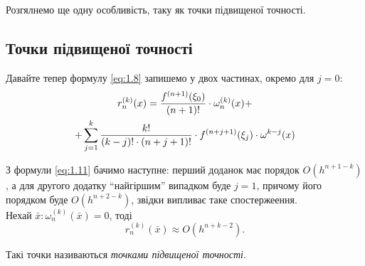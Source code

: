 Розгялнемо ще одну особливість, таку як точки підвищеної точності.

\subsection{Точки підвищеної точності}

Давайте тепер формулу \eqref{eq:1.8} запишемо у двох частинах, окремо для $j = 0$:
\begin{multline}
	\label{eq:1.11}
	r_n^{(k)}(x) = \frac{f^{(n + 1)}(\xi_0)}{(n + 1)!} \cdot \omega_n^{(k)}(x) + \\ + \displaystyle\sum\limits_{j = 1}^k \frac{k!}{(k-j)! \cdot (n+j+1)!} \cdot f^{(n + j + 1)}(\xi_j) \cdot \omega^{k - j}(x)
\end{multline}

З формули \eqref{eq:1.11} бачимо наступне: перший доданок має порядок $O(h^{n + 1 - k})$, а для другого додатку ``найгіршим'' випадком буде $j = 1$, причому його порядком буде $O(h^{n + 2 - k})$, звідки випливає таке спостержеення. \\

Нехай $\bar x: \omega_n^{(k)}(\bar x) = 0$, тоді 
\begin{equation}
	\label{eq:1.12}
	r_n^{(k)}(\bar x) \approx O({h^{n + k - 2}}).
\end{equation}

Такі точки називаються \textit{точками підвищеної точності}.

